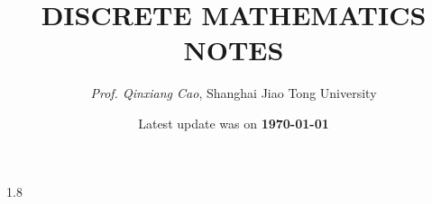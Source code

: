 \documentclass[a4paper,openany]{book}
\title{\textbf{DISCRETE MATHEMATICS NOTES}}
\date{Latest update was on \textbf{\today}}
\author{\textit{Prof. Qinxiang Cao}, Shanghai Jiao Tong University}
\theoremstyle{plain}
\theoremstyle{definition}
\begin{document}
	\maketitle
	\newpage
	\thispagestyle{empty}

    
    \frontmatter
    \begin{spacing}{1.8}
        \tableofcontents
    \end{spacing}

    \mainmatter
    
    
\end{document}
